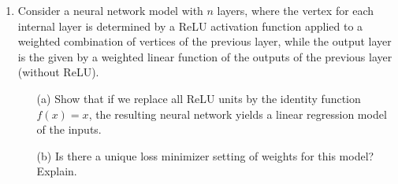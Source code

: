\documentclass[11pt]{article}
\begin{document}
\begin{enumerate}

\item Consider a neural network model with $n$ layers, where the vertex for each internal layer is determined by a ReLU activation function applied to a weighted combination of vertices of the previous layer, while the output layer is the given by a weighted linear function of the outputs of the previous layer (without ReLU).

\begin{itemize}

\item[(a)] Show that if we replace all ReLU units by the identity function $f(x) = x$, the resulting neural network yields a linear regression model of the inputs.

\item[(b)] Is there a unique loss minimizer setting of weights for this model?  Explain.

\end{itemize}

\begin{answertext}{20cm}{}


\end{answertext}
\end{enumerate}
\end{document}
